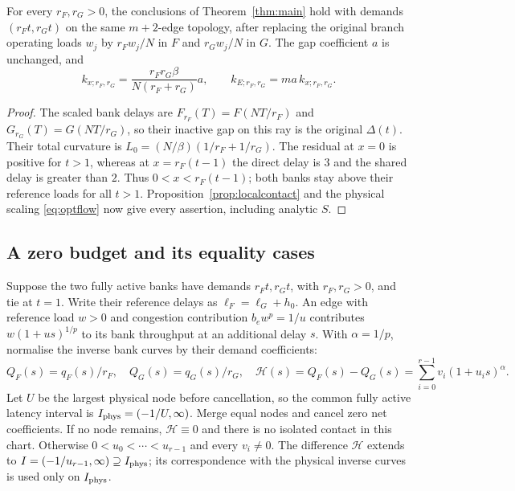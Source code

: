 \begin{corollary}\label{prop:unequal}
For every $r_F,r_G>0$, the conclusions of Theorem~\ref{thm:main} hold with demands $(r_Ft,r_Gt)$ on the same $m+2$-edge topology, after replacing the original branch operating loads $w_j$ by $r_Fw_j/N$ in $F$ and $r_Gw_j/N$ in $G$. The gap coefficient $a$ is unchanged, and
\begin{equation}
 k_{x;r_F,r_G}=\frac{r_Fr_G\beta}{N(r_F+r_G)}a,
 \qquad k_{E;r_F,r_G}=m a\,k_{x;r_F,r_G}.
\end{equation}
\end{corollary}
\begin{proof}
The scaled bank delays are $F_{r_F}(T)=F(NT/r_F)$ and $G_{r_G}(T)=G(NT/r_G)$, so their inactive gap on this ray is the original $\Delta(t)$. Their total curvature is $L_0=(N/\beta)(1/r_F+1/r_G)$. The residual at $x=0$ is positive for $t>1$, whereas at $x=r_F(t-1)$ the direct delay is $3$ and the shared delay is greater than $2$. Thus $0<x<r_F(t-1)$; both banks stay above their reference loads for all $t>1$. Proposition~\ref{prop:localcontact} and the physical scaling \eqref{eq:optflow} now give every assertion, including analytic $S$.
\end{proof}


\subsection{A zero budget and its equality cases}

Suppose the two fully active banks have demands $r_Ft,r_Gt$, with $r_F,r_G>0$, and tie at $t=1$. Write their reference delays as $\ell_F=\ell_G+h_0$. An edge with reference load $w>0$ and congestion contribution $b_ew^p=1/u$ contributes $w(1+us)^{1/p}$ to its bank throughput at an additional delay $s$. With $\alpha=1/p$, normalise the inverse bank curves by their demand coefficients:
\begin{equation}\label{mc:normalise}
 Q_F(s)=q_F(s)/r_F,\quad Q_G(s)=q_G(s)/r_G,\quad
 \mathcal H(s)=Q_F(s)-Q_G(s)=\sum_{i=0}^{r-1}v_i(1+u_is)^\alpha.
\end{equation}
Let $U$ be the largest physical node before cancellation, so the common fully active latency interval is $I_{\rm phys}=(-1/U,\infty)$. Merge equal nodes and cancel zero net coefficients. If no node remains, $\mathcal H\equiv0$ and there is no isolated contact in this chart. Otherwise $0<u_0<\cdots<u_{r-1}$ and every $v_i\ne0$. The difference $\mathcal H$ extends to $I=(-1/u_{r-1},\infty)\supseteq I_{\rm phys}$; its correspondence with the physical inverse curves is used only on $I_{\rm phys}$.

